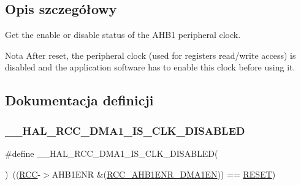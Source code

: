 \subsection{Opis szczegółowy}
Get the enable or disable status of the A\+H\+B1 peripheral clock. 

\begin{DoxyNote}{Nota}
After reset, the peripheral clock (used for registers read/write access) is disabled and the application software has to enable this clock before using it. 
\end{DoxyNote}


\subsection{Dokumentacja definicji}
\mbox{\label{group___r_c_c___a_h_b1___peripheral___clock___enable___disable___status_gae89d94d6252c79e450623f69eb939ed6}} 
\subsubsection{\texorpdfstring{\+\_\+\+\_\+\+H\+A\+L\+\_\+\+R\+C\+C\+\_\+\+D\+M\+A1\+\_\+\+I\+S\+\_\+\+C\+L\+K\+\_\+\+D\+I\+S\+A\+B\+L\+ED}{\_\_HAL\_RCC\_DMA1\_IS\_CLK\_DISABLED}}
{\footnotesize\ttfamily \#define \+\_\+\+\_\+\+H\+A\+L\+\_\+\+R\+C\+C\+\_\+\+D\+M\+A1\+\_\+\+I\+S\+\_\+\+C\+L\+K\+\_\+\+D\+I\+S\+A\+B\+L\+ED(\begin{DoxyParamCaption}{ }\end{DoxyParamCaption})~((\hyperlink{group___peripheral__declaration_ga74944438a086975793d26ae48d5882d4}{R\+CC}-\/$>$A\+H\+B1\+E\+NR \&(\hyperlink{group___peripheral___registers___bits___definition_gae07b00778a51a4e52b911aeccb897aba}{R\+C\+C\+\_\+\+A\+H\+B1\+E\+N\+R\+\_\+\+D\+M\+A1\+EN})) == \hyperlink{group___exported__types_gga89136caac2e14c55151f527ac02daaffa589b7d94a3d91d145720e2fed0eb3a05}{R\+E\+S\+ET})}



